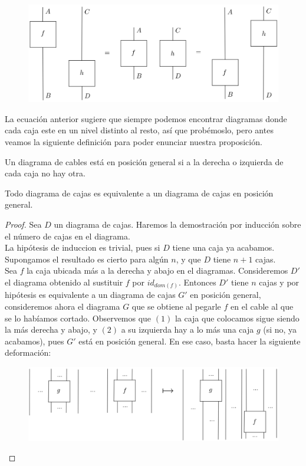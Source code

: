 \documentclass[../main.tex]{subfiles}
\begin{document}
\begin{figure}[H]
	\includegraphics[scale=2.9]{diagrama/intercambio.png}
	\centering
	\label{intercambio}
\end{figure}

La ecuación anterior sugiere que siempre podemos encontrar diagramas donde cada caja este en un nivel distinto al resto, así que probémoslo, pero antes veamos la siguiente definición para poder enunciar nuestra proposición.

\begin{dfn}
	Un diagrama de cables está en posición general si a la derecha o izquierda de cada caja no hay otra.
\end{dfn}

\begin{prop}
	Todo diagrama de cajas es equivalente a un diagrama de cajas en posición general. 
	\label{posgeneral}
\end{prop}
\begin{proof}
	Sea $D$ un diagrama de cajas. Haremos la demostración por inducción sobre el número de cajas en el diagrama. \\
	La hipótesis de induccion es trivial, pues si $D$ tiene una caja ya acabamos. \\
	Supongamos el resultado es cierto para algún $n$, y que $D$ tiene $n+1$ cajas. \\
	Sea $f$ la caja ubicada más a la derecha y abajo en el diagramas. Consideremos $D'$ el diagrama obtenido al sustituir $f$ por $id_{dom(f)}$. Entonces $D'$ tiene $n$ cajas y por hipótesis es equivalente a un diagrama de cajas $G'$ en posición general, consideremos ahora el diagrama $G$ que se obtiene al pegarle $f$ en el cable al que se lo habíamos cortado. Observemos que $(1)$ la caja que colocamos sigue siendo la más derecha y abajo, y $(2)$ a su  izquierda hay a lo más una caja $g$ (si no, ya acabamos), pues $G'$ está en posición general. En ese caso, basta hacer la siguiente deformación:
	
	\begin{figure}[H]
		\includegraphics[scale=5]{diagrama/formagen.png}
		\centering
	\end{figure}
\end{proof}
\end{document}
